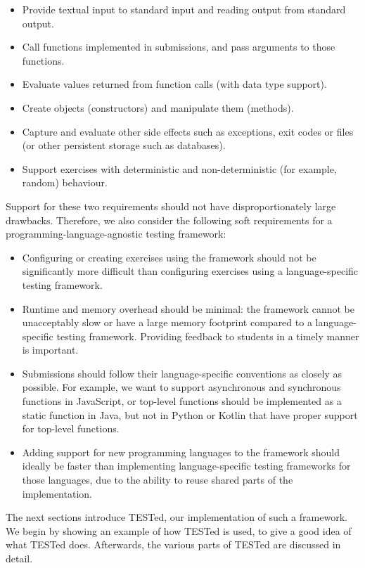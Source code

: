 \documentclass[../main]{subfiles}
\begin{document}
\begin{itemize}[noitemsep]
    \item Provide textual input to standard input and reading output from standard output.
    \item Call functions implemented in submissions, and pass arguments to those functions.
    \item Evaluate values returned from function calls (with data type support).
    \item Create objects (constructors) and manipulate them (methods).
    \item Capture and evaluate other side effects such as exceptions, exit codes or files (or other persistent storage such as databases).
    \item Support exercises with deterministic and non-deterministic (for example, random) behaviour.
\end{itemize}

Support for these two requirements should not have disproportionately large drawbacks.
Therefore, we also consider the following soft requirements for a programming-language-agnostic testing framework:

\begin{itemize}
    \item Configuring or creating exercises using the framework should not be significantly more difficult than configuring exercises using a language-specific testing framework.
    \item Runtime and memory overhead should be minimal: the framework cannot be unacceptably slow or have a large memory footprint compared to a language-specific testing framework.
    Providing feedback to students in a timely manner is important.
    \item Submissions should follow their language-specific conventions as closely as possible.
    For example, we want to support asynchronous and synchronous functions in JavaScript, or top-level functions should be implemented as a static function in Java, but not in Python or Kotlin that have proper support for top-level functions.
    \item Adding support for new programming languages to the framework should ideally be faster than implementing language-specific testing frameworks for those languages, due to the ability to reuse shared parts of the implementation.
\end{itemize}

The next sections introduce TESTed, our implementation of such a framework.
We begin by showing an example of how TESTed is used, to give a good idea of what TESTed does.
Afterwards, the various parts of TESTed are discussed in detail.
\end{document}
